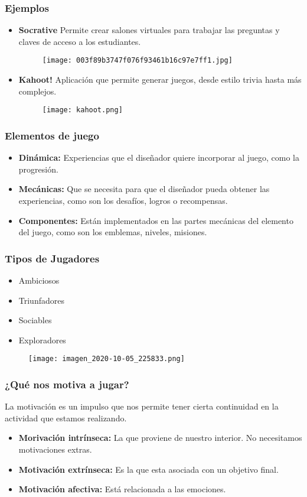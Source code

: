\documentclass[11pt]{beamer}
\begin{document}
\begin{frame}
\frametitle{Ejemplos}
\begin{itemize}
    \item {\bf Socrative} Permite crear salones virtuales para trabajar las preguntas y claves de acceso a los estudiantes.
    \begin{figure}
    \texttt{[image: 003f89b3747f076f93461b16c97e7ff1.jpg]}
    \label{fig:my_label}
\end{figure}
    \item {\bf Kahoot!} Aplicación que permite generar juegos, desde estilo trivia hasta más complejos.
    \begin{figure}
    \texttt{[image: kahoot.png]}
    \label{fig:my_label}
\end{figure}
\end{itemize}
\end{frame}

\begin{frame}
\frametitle{Elementos de juego}
\begin{itemize}
    \item {\bf Dinámica:} Experiencias que el diseñador quiere incorporar al juego, como la progresión.
    \item {\bf Mecánicas:} Que se necesita para que el diseñador pueda obtener las experiencias, como son los desafíos, logros o recompensas.
    \item {\bf Componentes:} Están implementados en las partes mecánicas del elemento del juego, como son los emblemas, niveles, misiones.
\end{itemize}
\end{frame}

\begin{frame}
\frametitle{Tipos de Jugadores}
\begin{itemize}
    \item  Ambiciosos
    \item Triunfadores
    \item Sociables
    \item Exploradores
\end{itemize}
\begin{figure}
    \centering
    \texttt{[image: imagen\_2020-10-05\_225833.png]}
    \label{fig:my_label}
\end{figure}
\end{frame}

\begin{frame}
\frametitle{¿Qué nos motiva a jugar?}
La motivación es un impulso que nos permite tener cierta continuidad en la actividad que estamos realizando.\\
\begin{itemize}
    \item {\bf Morivación intrínseca: } La que proviene de nuestro interior. No necesitamos motivaciones extras.
    \item {\bf Motivación extrínseca: } Es la que esta asociada con un objetivo final.
    \item {\bf Motivación afectiva: } Está relacionada a las emociones.
\end{itemize}
\end{frame}
\end{document}
